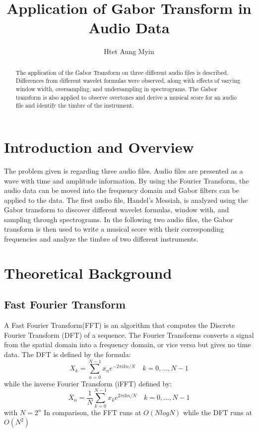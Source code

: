 \documentclass[a4paper,12pt]{article}
\begin{document}
\title{Application of Gabor Transform in Audio Data}
\author{Htet Aung Myin}
\maketitle
\begin{abstract}
The application of the Gabor Transform on three different audio files is described. Differences from different wavelet formulas were observed, along with effects of varying window width, oversampling, and undersampling in spectrograms. The Gabor transform is also applied to observe overtones and derive a musical score for an audio file and identify the timbre of the instrument.
\end{abstract}
\newpage
\section{Introduction and Overview}
The problem given is regarding three audio files. Audio files are presented as a wave with time and amplitude information. By using the Fourier Transform, the audio data can be moved into the frequency domain and Gabor filters can be applied to the data. The first audio file, Handel's Messiah, is analyzed using the Gabor transform to discover different wavelet formulas, window with, and sampling through spectrograms. In the following two audio files, the Gabor transform is then used to write a musical score with their corresponding frequencies and analyze the timbre of two different instruments.

 
\section{Theoretical Background}

\subsection{Fast Fourier Transform}
A Fast Fourier Transform(FFT) is an algorithm that computes the Discrete Fourier Transform (DFT) of a sequence. The Fourier Transforms converts a signal from the spatial domain into a frequency domain, or vice versa but gives no time data.
The DFT is defined by the formula:
$$
X_{k}=\sum_{n=0}^{N-1} x_{n} e^{-2 \pi i k n / N} \quad k=0, \ldots, N-1
$$
while the inverse Fourier Transform (iFFT) defined by:
$$
X_{n}=\frac{1}{N} \sum_{k=0}^{N-1} x_{k} e^{2 \pi i k n / N} \quad k=0, \ldots, N-1
$$
with $N = 2^n$
In comparison, the FFT runs at $O(N log N)$ while the DFT runs
at $O(N^2)$
\end{document}
